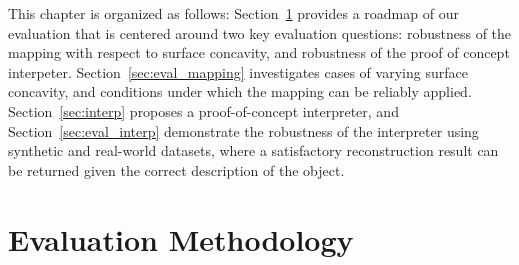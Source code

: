 
This chapter is organized as follows: Section~\ref{sec:interp_eval_methodology} provides a roadmap of our evaluation that is centered around two key evaluation questions: robustness of the mapping with respect to surface concavity, and robustness of the proof of concept interpeter. Section~\ref{sec:eval_mapping} investigates cases of varying surface concavity, and conditions under which the mapping can be reliably applied. Section~\ref{sec:interp} proposes a proof-of-concept interpreter, and Section~\ref{sec:eval_interp} demonstrate the robustness of the interpreter using synthetic and real-world datasets, where a satisfactory reconstruction result can be returned given the correct description of the object.


\section{Evaluation Methodology}
\label{sec:interp_eval_methodology}

